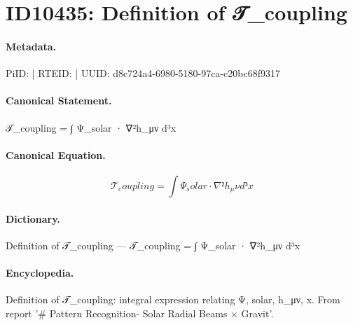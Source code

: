 \section*{ID10435: Definition of 𝒯\_coupling}
\paragraph{Metadata.}
PiID:  | RTEID:  | UUID: d8c724a4-6980-5180-97ca-c20bc68f9317

\paragraph{Canonical Statement.}
𝒯\_coupling = ∫ Ψ\_solar · ∇²h\_μν d³x

\paragraph{Canonical Equation.}
\[
𝒯_coupling = ∫ Ψ_solar · ∇²h_μν d³x
\]

\paragraph{Dictionary.}
Definition of 𝒯\_coupling — 𝒯\_coupling = ∫ Ψ\_solar · ∇²h\_μν d³x

\paragraph{Encyclopedia.}
Definition of 𝒯\_coupling: integral expression relating Ψ, solar, h\_μν, x. From report '\# Pattern Recognition- Solar Radial Beams × Gravit'.
